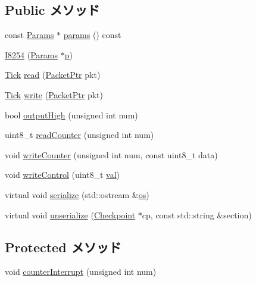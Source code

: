 \subsection*{Public メソッド}
\begin{DoxyCompactItemize}
\item 
const \hyperlink{classX86ISA_1_1I8254_aed9bbf7fa13cb3e5f1c7805d04bffb78}{Params} $\ast$ \hyperlink{classX86ISA_1_1I8254_acd3c3feb78ae7a8f88fe0f110a718dff}{params} () const 
\item 
\hyperlink{classX86ISA_1_1I8254_a05e554921bd92c71c55863df9cea8564}{I8254} (\hyperlink{classX86ISA_1_1I8254_aed9bbf7fa13cb3e5f1c7805d04bffb78}{Params} $\ast$\hyperlink{namespaceX86ISA_af675c1d542a25b96e11164b80809a856}{p})
\item 
\hyperlink{base_2types_8hh_a5c8ed81b7d238c9083e1037ba6d61643}{Tick} \hyperlink{classX86ISA_1_1I8254_a613ec7d5e1ec64f8d21fec78ae8e568e}{read} (\hyperlink{classPacket}{PacketPtr} pkt)
\item 
\hyperlink{base_2types_8hh_a5c8ed81b7d238c9083e1037ba6d61643}{Tick} \hyperlink{classX86ISA_1_1I8254_a4cefab464e72b5dd42c003a0a4341802}{write} (\hyperlink{classPacket}{PacketPtr} pkt)
\item 
bool \hyperlink{classX86ISA_1_1I8254_ab3ebc39ad58dd927f9da6958c45203a2}{outputHigh} (unsigned int num)
\item 
uint8\_\-t \hyperlink{classX86ISA_1_1I8254_a4794298e519275c38d6d8a8f169fd53b}{readCounter} (unsigned int num)
\item 
void \hyperlink{classX86ISA_1_1I8254_aa5af88439002d1cfeb0189113dfe4627}{writeCounter} (unsigned int num, const uint8\_\-t data)
\item 
void \hyperlink{classX86ISA_1_1I8254_a7267b713581b4b13f0c1257103732da1}{writeControl} (uint8\_\-t \hyperlink{namespaceX86ISA_ae13bf1250853ff6b72aabe3c79b587cc}{val})
\item 
virtual void \hyperlink{classX86ISA_1_1I8254_a53e036786d17361be4c7320d39c99b84}{serialize} (std::ostream \&\hyperlink{namespaceX86ISA_a6b6e6ba763e7eaf46ac5b6372ca98d30}{os})
\item 
virtual void \hyperlink{classX86ISA_1_1I8254_af22e5d6d660b97db37003ac61ac4ee49}{unserialize} (\hyperlink{classCheckpoint}{Checkpoint} $\ast$cp, const std::string \&section)
\end{DoxyCompactItemize}
\subsection*{Protected メソッド}
\begin{DoxyCompactItemize}
\item 
void \hyperlink{classX86ISA_1_1I8254_abe266c027cb8a03b2e1e2f08d9398679}{counterInterrupt} (unsigned int num)
\end{DoxyCompactItemize}
